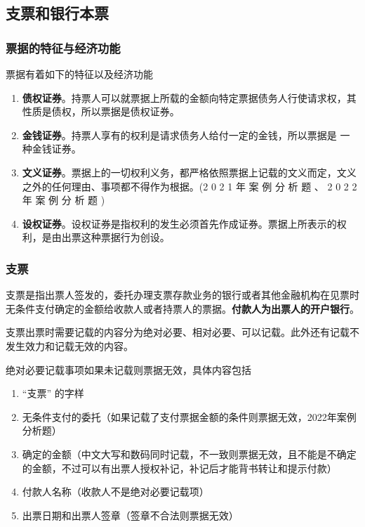 \documentclass[UTF8,12pt]{ctexart}
\numberwithin{equation}{section} %
\numberwithin{figure}{section}
\numberwithin{table}{section}
\begin{document}
	\subsection{支票和银行本票}
	\subsubsection{票据的特征与经济功能} 
	票据有着如下的特征以及经济功能
	\begin{enumerate}
		\item \textbf{债权证券}。持票人可以就票据上所载的金额向特定票据债务人行使请求权，其性质是债权，所以票据是债权证券。
		
		\item \textbf{金钱证券}。持票人享有的权利是请求债务人给付一定的金钱，所以票据是 一种金钱证券。 
		
		\item \textbf{文义证券}。票据上的一切权利义务，都严格依照票据上记载的文义而定，文义之外的任何理由、事项都不得作为根据。(2 0 2 1 年 案 例 分 析 题 、 2 0 2 2 年 案 例 分 析 题 )
		
		\item \textbf{设权证券}。设权证券是指权利的发生必须首先作成证券。票据上所表示的权利，是由出票这种票据行为创设。
	\end{enumerate}
	
	\subsubsection{支票}
	支票是指出票人签发的，委托办理支票存款业务的银行或者其他金融机构在见票时无条件支付确定的金额给收款人或者持票人的票据。\textbf{付款人为出票人的开户银行}。
	
	支票出票时需要记载的内容分为绝对必要、相对必要、可以记载。此外还有记载不发生效力和记载无效的内容。
	
	绝对必要记载事项如果未记载则票据无效，具体内容包括
	\begin{enumerate}
		\item “支票” 的字样
		
		\item 无条件支付的委托（如果记载了支付票据金额的条件则票据无效，2022年案例分析题）
		
		\item 确定的金额（中文大写和数码同时记载，不一致则票据无效，且不能是不确定的金额，不过可以有出票人授权补记，补记后才能背书转让和提示付款）
		
		\item 付款人名称（收款人不是绝对必要记载项）
		
		\item 出票日期和出票人签章（签章不合法则票据无效）
	\end{enumerate}
	
\end{document}
